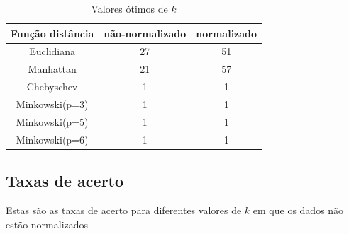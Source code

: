 \documentclass[10pt,a4paper,twocolumn]{article}
\begin{document}
  \begin{table}[ht]
    \caption{{\scriptsize Valores ótimos de $k$}}
    \centering
    \begin{tabular}{c c c}
      \hline\hline 
      {\scriptsize Função distância} 
      & {\scriptsize não-normalizado} 
      & {\scriptsize normalizado} \\ [0.5ex]
      \hline
      {\scriptsize Euclidiana}     & \small 27 & \small 51 \\
      {\scriptsize Manhattan}      & \small 21 & \small 57 \\
      {\scriptsize Chebyschev}     & \small  1 & \small  1 \\
      {\scriptsize Minkowski(p=3)} & \small  1 & \small  1 \\
      {\scriptsize Minkowski(p=5)} & \small  1 & \small  1 \\
      {\scriptsize Minkowski(p=6)} & \small  1 & \small  1 \\
      [1ex]
      \hline
    \end{tabular}
  \end{table}
  

    \subsection{Taxas de acerto}

      Estas são as taxas de acerto para diferentes valores de $k$ em que os
      dados não estão normalizados
\end{document}
